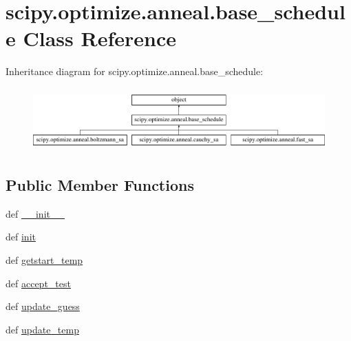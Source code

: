 \hypertarget{classscipy_1_1optimize_1_1anneal_1_1base__schedule}{}\section{scipy.\+optimize.\+anneal.\+base\+\_\+schedule Class Reference}
\label{classscipy_1_1optimize_1_1anneal_1_1base__schedule}
Inheritance diagram for scipy.\+optimize.\+anneal.\+base\+\_\+schedule\+:\begin{figure}[H]
\begin{center}
\leavevmode
\includegraphics[height=2.434783cm]{classscipy_1_1optimize_1_1anneal_1_1base__schedule}
\end{center}
\end{figure}
\subsection*{Public Member Functions}
\begin{DoxyCompactItemize}
\item 
def \hyperlink{classscipy_1_1optimize_1_1anneal_1_1base__schedule_a0b6a9e3c0ce26bdd70e294689751de5b}{\+\_\+\+\_\+init\+\_\+\+\_\+}
\item 
def \hyperlink{classscipy_1_1optimize_1_1anneal_1_1base__schedule_a4b1fcb17c9eedd22941fdcf702959633}{init}
\item 
def \hyperlink{classscipy_1_1optimize_1_1anneal_1_1base__schedule_a02d781016fd35a01527d31f6dd570c45}{getstart\+\_\+temp}
\item 
def \hyperlink{classscipy_1_1optimize_1_1anneal_1_1base__schedule_afd8c7bf5d233816e7e8f5f6245ffbf9a}{accept\+\_\+test}
\item 
def \hyperlink{classscipy_1_1optimize_1_1anneal_1_1base__schedule_a7b836fbaa2e1b8c5c5ce67b35bc86c00}{update\+\_\+guess}
\item 
def \hyperlink{classscipy_1_1optimize_1_1anneal_1_1base__schedule_a55a52ee4baab464d3402d89f8c978af0}{update\+\_\+temp}
\end{DoxyCompactItemize}

